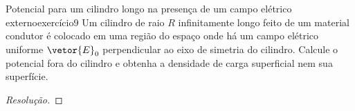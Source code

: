 \begin{exercício}{Potencial para um cilindro longo na presença de um campo elétrico externo}{exercício9}
    Um cilindro de raio \(R\) infinitamente longo feito de um material condutor é colocado em uma região do espaço onde há um campo elétrico uniforme \(\vetor{E}_0\) perpendicular ao eixo de simetria do cilindro. Calcule o potencial fora do cilindro e obtenha a densidade de carga superficial nem sua superfície.
\end{exercício}
\begin{proof}[Resolução]


\end{proof}
